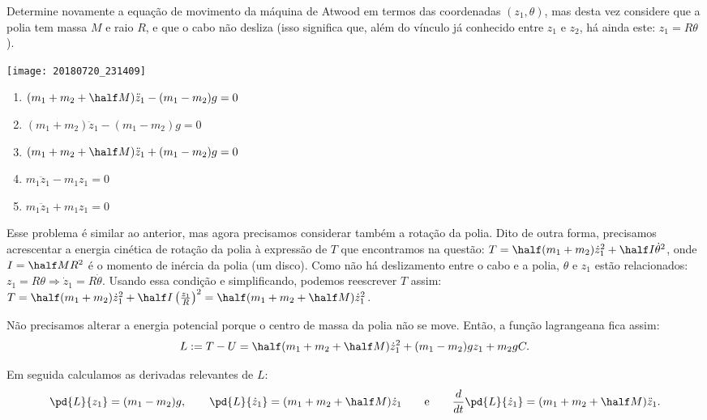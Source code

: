\begin{question}
  	Determine novamente a equação de movimento da máquina de Atwood em termos das coordenadas $(z_1, \theta)$, mas desta vez considere que a polia tem massa $M$ e raio $R$, e que o cabo não desliza (isso significa que, além do vínculo já conhecido entre $z_1$ e $z_2$, há ainda este: $z_1 = R\theta$).

  	\begin{center}
      \texttt{[image: 20180720\_231409]}
    \end{center}

  	\begin{enumerate}
  		\item $(m_1 + m_2 + \half M) \ddot z_1 - (m_1 - m_2)g = 0$ \rightanswer
  		\item $(m_1 + m_2 ) \ddot z_1 - (m_1 - m_2)g = 0$
  		\item $(m_1 + m_2 + \half M) \ddot z_1 + (m_1 - m_2)g = 0$
  		\item $m_1 \ddot z_1 - m_1 z_1 = 0$
  		\item $m_1 \ddot z_1 + m_1 z_1 = 0$
  	\end{enumerate}

    \begin{solution}
      Esse problema é similar ao anterior, mas agora precisamos considerar também a rotação da polia.
      Dito de outra forma, precisamos acrescentar a energia cinética de rotação da polia à expressão de $T$ que encontramos na questão: $T = \half (m_1 + m_2) \dot z_1^2 + \half I \dot\theta^2$, onde $I = \half MR^2$ é o momento de inércia da polia (um disco).
      Como não há deslizamento entre o cabo e a polia, $\theta$ e $z_1$ estão relacionados: $z_1 = R\theta \Rightarrow \dot z_1 = R\dot \theta$.
      Usando essa condição e simplificando, podemos reescrever $T$ assim: $T = \half (m_1 + m_2) \dot z_1^2 + \half I \left(\frac{z_1}{R}\right)^2 = \half (m_1 + m_2 + \half M) \dot z_1^2$.

      Não precisamos alterar a energia potencial porque o centro de massa da polia não se move.
      Então, a função lagrangeana fica assim:
      \begin{equation*}
        L := T - U = \half (m_1 + m_2 + \half M) \dot z_1^2 + (m_1 - m_2)gz_1 + m_2gC.
      \end{equation*}

      Em seguida calculamos as derivadas relevantes de $L$:
      \begin{equation*}
        \pd{L}{z_1} = (m_1 - m_2) g,
        \qquad
        \pd{L}{\dot z_1} = (m_1 + m_2 + \half M)\dot z_1
        \qquad\text{e}\qquad
        \frac{d}{dt}\pd{L}{\dot z_1} = (m_1 + m_2 + \half M)\ddot z_1.
      \end{equation*}
      

\end{solution}
\end{question}
